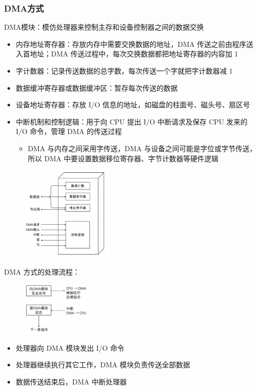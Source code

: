 \documentclass[cs4size,a4paper,10pt]{ctexart}
\begin{document}
	\subsubsection{DMA方式}
	DMA模块：模仿处理器来控制主存和设备控制器之间的数据交换
	\begin{itemize}
		\item 内存地址寄存器：存放内存中需要交换数据的地址，DMA 传送之前由程序送入首地址；DMA 传送过程中，每次交换数据都把地址寄存器的内容加 1
		\item 字计数器：记录传送数据的总字数，每次传送一个字就把字计数器减 1
		\item 数据缓冲寄存器或数据缓冲区：暂存每次传送的数据
		\item 设备地址寄存器：存放 I/O 信息的地址，如磁盘的柱面号、磁头号、扇区号
		\item 中断机制和控制逻辑：用于向 CPU 提出 I/O 中断请求及保存 CPU 发来的 I/O 命令，管理 DMA 的传送过程
		\begin{itemize}
			\item DMA 与内存之间采用字传送，DMA 与设备之间可能是字位或字节传送，所以 DMA 中要设置数据移位寄存器、字节计数器等硬件逻辑
		\end{itemize}
	\end{itemize}
	\begin{figure}[H]
		\centering
		\includegraphics[width=0.4\textwidth]{img/4.1.2.5}
	\end{figure}

	DMA 方式的处理流程：
	\begin{figure}[H]
		\centering
		\includegraphics[width=0.3\textwidth]{img/4.1.2.5.1}
	\end{figure}
	\begin{itemize}
		\item 处理器向 DMA 模块发出 I/O 命令
		\item 处理器继续执行其它工作，DMA 模块负责传送全部数据
		\item 数据传送结束后，DMA 中断处理器
	\end{itemize}
\end{document}
